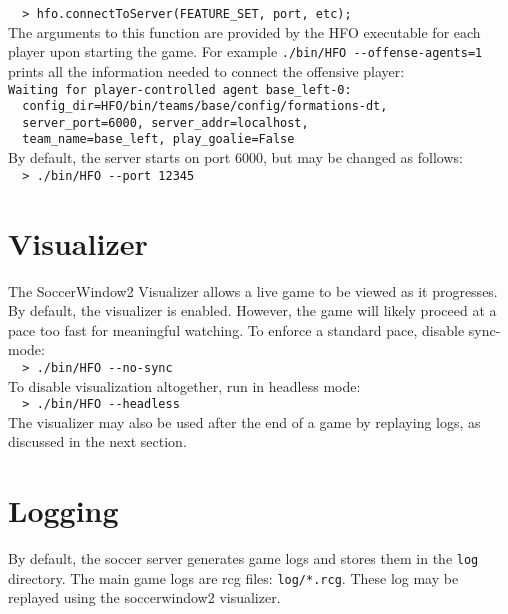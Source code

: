 \documentclass[12pt]{article}
\begin{document}
\noindent \verb+  > hfo.connectToServer(FEATURE_SET, port, etc);+\\

The arguments to this function are provided by the HFO executable for
each player upon starting the game. For example
\verb|./bin/HFO --offense-agents=1| prints all the information needed
to connect the offensive player:\\

\noindent \verb+Waiting for player-controlled agent base_left-0: +\\
\noindent \verb+  config_dir=HFO/bin/teams/base/config/formations-dt,+\\
\noindent \verb+  server_port=6000, server_addr=localhost,+\\
\noindent \verb+  team_name=base_left, play_goalie=False+\\

By default, the server starts on port 6000, but may be changed as follows:\\

\noindent \verb+  > ./bin/HFO --port 12345+

\section{Visualizer}

The SoccerWindow2 Visualizer allows a live game to be viewed as it
progresses. By default, the visualizer is enabled. However, the game
will likely proceed at a pace too fast for meaningful watching. To
enforce a standard pace, disable sync-mode:\\

\noindent \verb+  > ./bin/HFO --no-sync+\\

To disable visualization altogether, run in headless mode:\\

\noindent \verb+  > ./bin/HFO --headless+\\

The visualizer may also be used after the end of a game by replaying
logs, as discussed in the next section.

\section{Logging}

By default, the soccer server generates game logs and stores them in
the \verb+log+ directory. The main game logs are rcg files:
\verb+log/*.rcg+. These log may be replayed using the soccerwindow2
visualizer. \\
\end{document}
